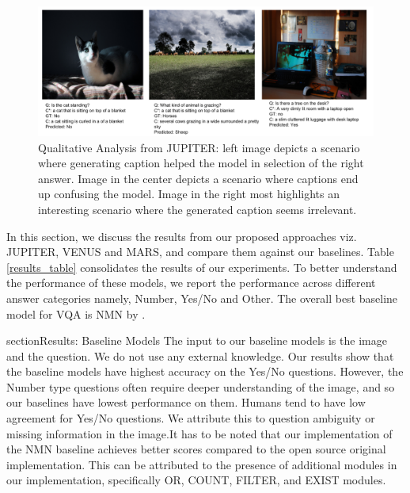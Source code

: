 \begin{figure} [h]
    \centering
    \includegraphics[scale=0.3]{images/captions.png}
    \caption{Qualitative Analysis from JUPITER: left image depicts a scenario where generating caption helped the model in selection of the right answer. Image in the center depicts a scenario where captions end up confusing the model. Image in the right most highlights an interesting scenario where the generated caption seems irrelevant.}
    \label{fig:jupiter_qualitative}
\end{figure}
In this section, we discuss the results from our proposed approaches viz. JUPITER, VENUS and MARS, and compare them against our baselines. Table \ref{results_table} consolidates the results of our experiments. To better understand the performance of these models, we report the performance across different answer categories namely, Number, Yes/No and Other. The overall best baseline model for VQA is NMN by \cite{HuARDS17}.

section{Results: Baseline Models}
The input to our baseline models is the image and the question. We do not use any external knowledge. Our results show that the baseline models have highest accuracy on the Yes/No questions. However, the Number type questions often require deeper understanding of the image, and so our baselines have lowest performance on them. Humans tend to have low agreement for Yes/No questions. We attribute this to question ambiguity or missing information in the image.It has to be noted that our implementation of the NMN baseline achieves better scores compared to the open source original implementation. This can be attributed to the presence of additional modules in our implementation, specifically OR, COUNT, FILTER, and EXIST modules.

